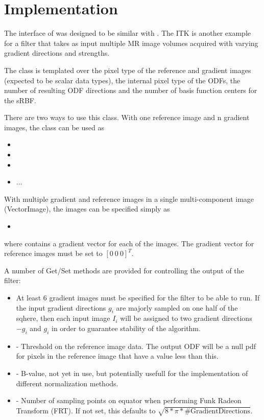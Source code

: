 \documentclass{InsightArticle}
\begin{document}
\section{Implementation}
The interface of  was designed to be similar with
. The ITK  is another example for a filter that
takes as input multiple MR image volumes acquired with varying gradient directions and strengths.

The class is templated over the pixel type of the reference and gradient images (expected to be scalar data types), the internal pixel type of the ODFs, the number of resulting ODF directions and the number of basis function centers for the sRBF.

There are two ways to use this class. With one reference image and n gradient images, the class can be used as
\begin{itemize}
	\item {}
	\item {}
	\item {}
	\item ...
\end{itemize}
 
With multiple gradient and reference images in a single multi-component image (VectorImage), the images can be specified simply as
\begin{itemize}
	\item {}
\end{itemize}
where  contains a gradient vector for each of the images. The gradient vector for reference images must be set to $\left[ 0\ 0\ 0 \right]^T$.

A number of Get/Set methods are provided for controlling the output of the filter:

\begin{itemize}
  \item{At least 6 gradient images must be specified for the filter to be able to run. If the input gradient directions $g_i$ are majorly sampled on one half of the sqhere, then each input image $I_i$ will be assigned to two gradient directions $-g_i$ and $g_i$ in order to guarantee stability of the algorithm.}
	\item{ - Threshold on the reference image data. The output ODF will be a null pdf for pixels in the reference image that have a value less than this.}
	\item{ - B-value, not yet in use, but potentially usefull for the implementation of different normalization methods. }
	\item{ - Number of sampling points on equator when performing Funk Radeon Transform (FRT). If not set, this defaults to $\sqrt{8*\pi*\mbox{\#GradientDirections}}$. }
\end{itemize}
\end{document}
